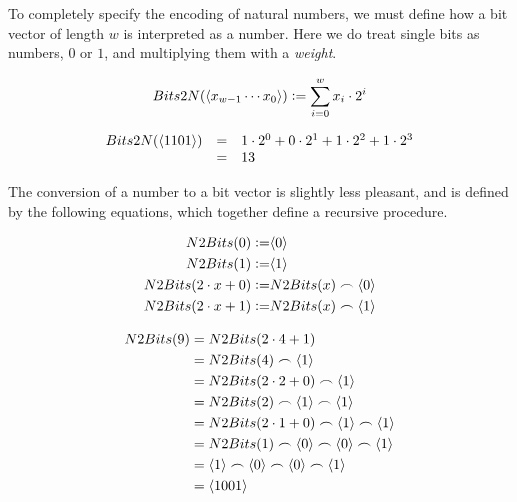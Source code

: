 To completely specify the encoding of natural numbers, we must define
how a bit vector of length $w$ is interpreted as a number.  Here we do
treat single bits as numbers, $0$ or $1$, and multiplying them with a
\emph{weight}.

\begin{definition}
\begin{align*}
    Bits2N(\langle x_{w-1}\cdots x_{0} \rangle) \vcentcolon= \sum_{i=0}^{w} x_{i} \cdot{} 2^{i}
\end{align*}
\label{def:bits2n}
\end{definition}

\begin{example}
  \[
    \begin{array}{rcl}
      Bits2N(\langle 1101 \rangle) & = & 1 \cdot 2^{0} + 0 \cdot 2^{1} + 1 \cdot 2^{2} + 1 \cdot 2^{3} \\
                               & = & 13
    \end{array}
  \]
\end{example}

The conversion of a number to a bit vector is slightly less pleasant,
and is defined by the following equations, which together define a
recursive procedure.

\begin{definition}
  \begin{align}
    N2Bits(0) \vcentcolon= & \langle 0 \rangle \\
    N2Bits(1) \vcentcolon= & \langle 1 \rangle \\
    N2Bits(2\cdot{}x + 0) \vcentcolon= & N2Bits(x)\frown\langle 0 \rangle \\
    N2Bits(2\cdot{}x + 1) \vcentcolon= & N2Bits(x)\frown\langle 1 \rangle
  \end{align}
\end{definition}

  \begin{example}
\begin{align*}
  N2Bits(9) &= N2Bits(2\cdot{}4 + 1) \\
            &= N2Bits(4) \frown \langle 1 \rangle \\
            &= N2Bits(2\cdot{}2 + 0) \frown \langle 1 \rangle \\
            &= N2Bits(2) \frown \langle 1 \rangle \frown \langle 1 \rangle \\
            &= N2Bits(2\cdot{}1 + 0) \frown \langle 1 \rangle \frown \langle 1 \rangle \\
            &= N2Bits(1) \frown \langle 0 \rangle \frown \langle 0 \rangle \frown \langle 1 \rangle \\
            &= \langle 1 \rangle \frown \langle 0 \rangle \frown \langle 0 \rangle \frown \langle 1 \rangle \\
            &= \langle 1001 \rangle
\end{align*}
  \end{example}


